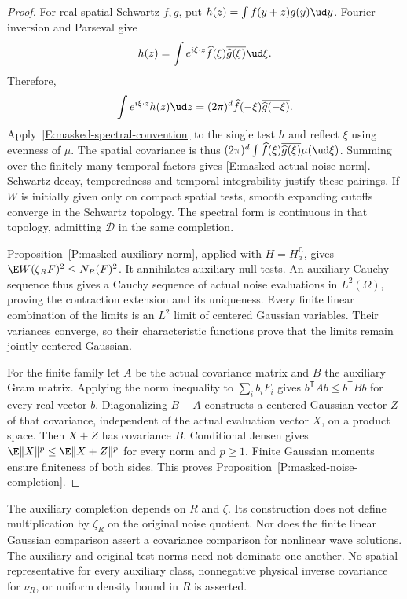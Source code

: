 \begin{proof}
  For real spatial Schwartz $f,g$, put
  $h(z) = \int f(y+z)g(y)\ud y$. Fourier inversion and Parseval give
  \[
    h(z) = \int e^{i\xi\cdot z}\widehat f(\xi)
    \overline{\widehat g(\xi)}\ud\xi.
  \]
  Therefore,
  \[
    \int e^{i\xi\cdot z}h(z)\ud z
    = (2\pi)^d\widehat f(-\xi)\overline{\widehat g(-\xi)}.
  \]
  Apply~\eqref{E:masked-spectral-convention} to the single test $h$ and
  reflect $\xi$ using evenness of $\mu$. The spatial covariance is thus
  $(2\pi)^d\int\widehat f(\xi)\overline{\widehat g(\xi)}\mu(\ud\xi)$.
  Summing over the finitely many temporal factors gives
  \eqref{E:masked-actual-noise-norm}. Schwartz decay, temperedness and
  temporal integrability justify these pairings. If $W$ is initially
  given only on compact spatial tests, smooth expanding cutoffs converge
  in the Schwartz topology. The spectral form is continuous in that
  topology, admitting $\mathcal D$ in the same completion.

  Proposition~\ref{P:masked-auxiliary-norm}, applied with
  $H = H_a^{\mathbb C}$, gives $\E W(\zeta_RF)^2 \le N_R(F)^2$.
  It annihilates auxiliary-null tests. An auxiliary Cauchy sequence thus
  gives a Cauchy sequence of actual noise evaluations in $L^2(\Omega)$,
  proving the contraction extension and its uniqueness. Every finite
  linear combination of the limits is an $L^2$ limit of centered Gaussian
  variables. Their variances converge, so their characteristic functions
  prove that the limits remain jointly centered Gaussian.

  For the finite family let $A$ be the actual covariance matrix and $B$ the
  auxiliary Gram matrix. Applying the norm inequality to $\sum_i b_iF_i$
  gives $b^{\mathsf T}Ab \le b^{\mathsf T}Bb$ for every real vector $b$.
  Diagonalizing $B-A$ constructs a centered Gaussian vector $Z$ of that
  covariance, independent of the actual evaluation vector $X$, on a product
  space. Then $X+Z$ has covariance $B$. Conditional Jensen gives
  $\E\|X\|^p \le \E\|X+Z\|^p$ for every norm and $p \ge 1$.
  Finite Gaussian moments ensure finiteness of both sides.
  This proves Proposition~\ref{P:masked-noise-completion}.
\end{proof}

The auxiliary completion depends on $R$ and $\zeta$. Its construction
does not define multiplication by $\zeta_R$ on the original noise
quotient. Nor does the finite linear Gaussian comparison assert a
covariance comparison for nonlinear wave solutions.
The auxiliary and original test norms need not dominate one another.
No spatial representative for every auxiliary class, nonnegative physical
inverse covariance for $\nu_R$, or uniform density bound in $R$ is asserted.

